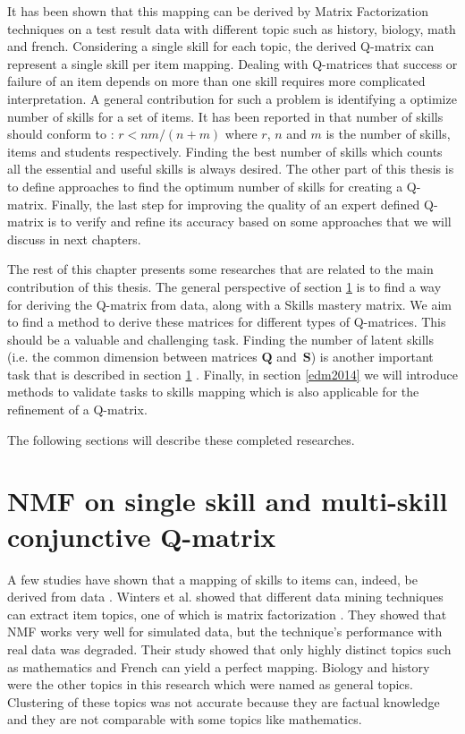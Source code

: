 It has been shown that this mapping can be derived by Matrix Factorization techniques \citep{desmarais2011conditions,desmarais2012item} on a test result data with different topic such as history, biology, math and french. Considering a single skill for each topic, the derived Q-matrix can represent a single skill per item mapping. Dealing with Q-matrices that success or failure of an item depends on more than one skill requires more complicated interpretation. 
A general contribution for such a problem is identifying a optimize number of skills for a set of items. It has been reported in \citep{lee1999learning} that number of skills should conform to : $r < nm/(n+m)$ where $r$, $n$ and $m$ is the number of skills, items and students respectively. Finding the best number of skills which counts all the essential and useful skills is always desired. The other part of this thesis is to define approaches to find the optimum number of skills for creating a Q-matrix. Finally, the last step for improving the quality of an expert defined Q-matrix is to verify and refine its accuracy  based on some approaches that we will discuss in next chapters.



The rest of this chapter presents some researches that are related to the main contribution of this thesis. The general perspective of section \ref{ITS2012} is to find a way for deriving the Q-matrix from data, along with a Skills mastery matrix. We aim to find a method to derive these matrices for different types of Q-matrices. This should be a valuable and challenging task. Finding the number of latent skills (i.e. the common dimension between matrices $\mathbf{Q}$ and~$\mathbf{S}$) is another important task that is described in section \ref{ITS2012} . Finally, in section \ref{edm2014} we will introduce methods to validate tasks to skills mapping which is also applicable for the refinement of a Q-matrix.

The following sections will describe these completed researches.


\section{NMF on single skill and multi-skill conjunctive Q-matrix}
\label{ITS2012}

A few studies have shown that a mapping of skills to items can, indeed, be derived from data \citep{delafayette2006educational,desmarais2011conditions}. Winters et al. showed that different data mining techniques can extract item topics, one of which is matrix factorization \citep{delafayette2006educational}. They showed that NMF works very well for simulated data, but the technique\textquoteright{}s performance with real data was degraded. Their study showed that only highly distinct topics such as mathematics and French can yield a perfect mapping. Biology and history were the other topics in this research which were named as general topics. Clustering of these topics was not accurate because they are factual knowledge and they are not comparable with some topics like mathematics.

